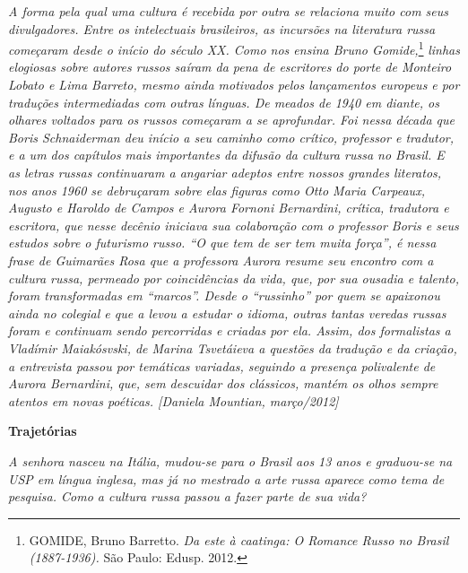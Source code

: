 \emph{A forma pela qual uma cultura é recebida por outra se relaciona
muito com seus divulgadores. Entre os intelectuais brasileiros, as
incursões na literatura russa começaram desde o início do século XX.
Como nos ensina Bruno Gomide,}\footnote{GOMIDE, Bruno Barretto. \emph{Da
  este à caatinga: O Romance Russo no Brasil (1887-1936).} São Paulo:
  Edusp. 2012.} \emph{linhas elogiosas sobre autores russos saíram da
pena de escritores do porte de Monteiro Lobato e Lima Barreto, mesmo
ainda motivados pelos lançamentos europeus e por traduções intermediadas
com outras línguas. De meados de 1940 em diante, os olhares voltados
para os russos começaram a se aprofundar. Foi nessa década que Boris
Schnaiderman deu início a seu caminho como crítico, professor e
tradutor, e a um dos capítulos mais importantes da difusão da cultura
russa no Brasil. E as letras russas continuaram a angariar adeptos entre
nossos grandes literatos, nos anos 1960 se debruçaram sobre elas figuras
como Otto Maria Carpeaux, Augusto e Haroldo de Campos e Aurora Fornoni
Bernardini, crítica, tradutora e escritora, que nesse decênio iniciava
sua colaboração com o professor Boris e seus estudos sobre o futurismo
russo. ``O que tem de ser tem muita força'', é nessa frase de Guimarães
Rosa que a professora Aurora resume seu encontro com a cultura russa,
permeado por coincidências da vida, que, por sua ousadia e talento,
foram transformadas em ``marcos''. Desde o ``russinho'' por quem se
apaixonou ainda no colegial e que a levou a estudar o idioma, outras
tantas veredas russas foram e continuam sendo percorridas e criadas por
ela. Assim, dos formalistas a Vladímir Maiakósvski, de Marina Tsvetáieva
a questões da tradução e da criação, a entrevista passou por temáticas
variadas, seguindo a presença polivalente de Aurora Bernardini, que, sem
descuidar dos clássicos, mantém os olhos sempre atentos em novas
poéticas. {[}Daniela Mountian, março/2012{]}}

\textbf{Trajetórias}

\emph{A senhora nasceu na Itália, mudou-se para o Brasil aos 13 anos e
graduou-se na USP em língua inglesa, mas já no mestrado a arte russa
aparece como tema de pesquisa. Como a cultura russa passou a fazer parte
de sua vida?}

